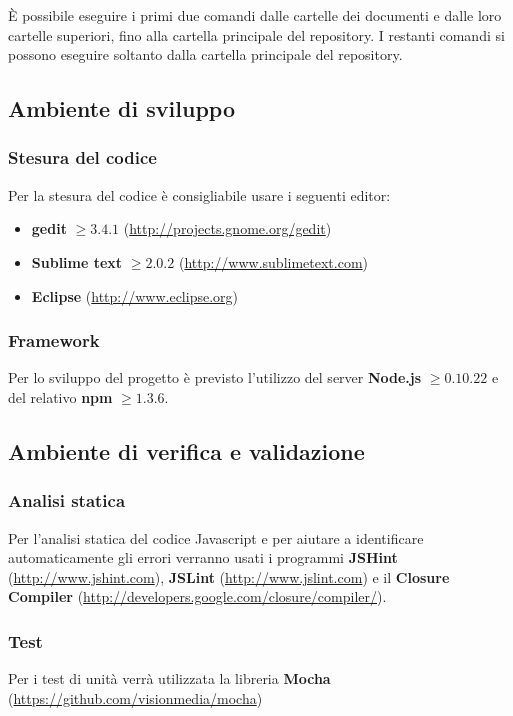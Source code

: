 È possibile eseguire i primi due comandi dalle cartelle dei documenti e dalle loro cartelle superiori, fino alla cartella principale del repository. I restanti comandi si possono eseguire soltanto dalla cartella principale del repository.

	\subsection{Ambiente di sviluppo}
		
		\subsubsection{Stesura del codice}
		
		Per la stesura del codice è consigliabile usare i seguenti editor:
		\begin{itemize}
			\item \textbf{gedit} $\geq 3.4.1$ (\url{http://projects.gnome.org/gedit})
			\item \textbf{Sublime text} $\geq 2.0.2$ (\url{http://www.sublimetext.com})
			\item \textbf{Eclipse} (\url{http://www.eclipse.org})
		\end{itemize}
		
		\subsubsection{Framework}
		
		Per lo sviluppo del progetto è previsto l'utilizzo del server \textbf{Node.js} $\geq 0.10.22$ e del relativo  \textbf{npm} $\geq 1.3.6$.

	\subsection{Ambiente di verifica e validazione}
		\subsubsection{Analisi statica}
		
		Per l'analisi statica del codice Javascript e per aiutare a identificare automaticamente gli errori verranno usati i programmi \textbf{JSHint} (\url{http://www.jshint.com}), \textbf{JSLint} (\url{http://www.jslint.com}) e il \textbf{Closure Compiler} (\url{http://developers.google.com/closure/compiler/}).
		
		
		\subsubsection{Test}
		
		Per i test di unità verrà utilizzata la libreria \textbf{Mocha} (\url{https://github.com/visionmedia/mocha})
		
		
